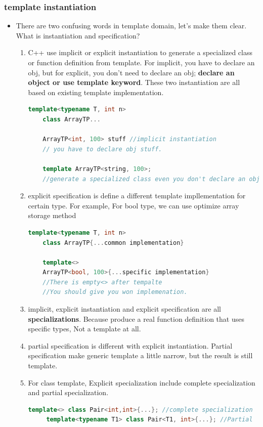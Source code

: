 \documentclass[a4paper,12pt,twoside]{book}
\begin{document}
\subsubsection{template instantiation}
\begin{itemize}
\item There are two confusing words in template domain, let's make them clear. What is instantiation and specification?
\begin{enumerate}
	\item C++ use implicit or explicit instantiation to generate a specialized class or function definition from template. For implicit, you have to declare an obj, but for explicit, you don't need to declare an obj; \textbf{declare an object or use template keyword}. These two instantiation are all based on existing template implementation.
	
	\begin{lstlisting}[frame=single, language=c++]
	template<typename T, int n>
	class ArrayTP...
	
	ArrayTP<int, 100> stuff //implicit instantiation
	// you have to declare obj stuff.
	
	template ArrayTP<string, 100>;
	//generate a specialized class even you don't declare an obj
	\end{lstlisting}
	\item explicit specification is define a different template impllementation for certain type. For example, For bool type, we can use optimize array storage method
		\begin{lstlisting}[frame=single, language=c++]
	template<typename T, int n>
	class ArrayTP{...common implementation}
	
	template<>
	ArrayTP<bool, 100>{...specific implementation}
	//There is empty<> after tempalte
	//You should give you won implemenation.
	\end{lstlisting}
	 \item implicit, explicit instantiation and explicit specification are all \textbf{specializations}. Because produce a real function definition that uses specific types, Not a template at all.
	 
	 \item partial specification is different with explicit instantiation. Partial specification make generic template a little narrow, but the result is still template. 
	 
	 \item For class template, Explicit specialization include complete specialization and partial specialization.
	 \begin{lstlisting}[frame=single, language=c++]
	 template<> class Pair<int,int>{...}; //complete specialization
	 template<typename T1> class Pair<T1, int>{...}; //Partial
	 \end{lstlisting}
	 

\end{enumerate}
\end{itemize}
\end{document}

